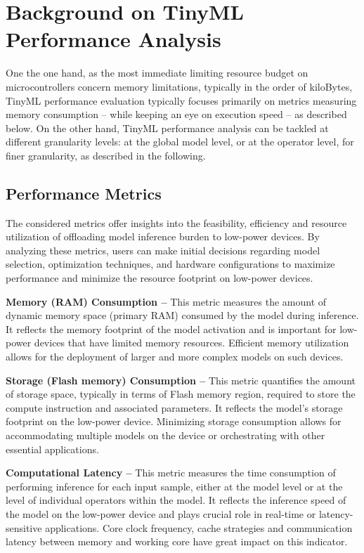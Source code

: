 
\section{Background on TinyML Performance Analysis}

One the one hand, as the most immediate limiting resource budget on microcontrollers concern memory limitations, typically in the order of kiloBytes, TinyML performance evaluation typically focuses primarily on metrics measuring memory consumption -- while keeping an eye on execution speed -- as described below.
On the other hand, TinyML performance analysis can be tackled at different granularity levels: at the global model level, or at the operator level, for finer granularity, as described in the following.

\subsection{Performance Metrics}
The considered metrics offer insights into the feasibility, efficiency and resource utilization of offloading model inference burden to low-power devices. By analyzing these metrics, users can make initial decisions regarding model  selection, optimization techniques, and hardware configurations to maximize performance and minimize the resource footprint on low-power devices.

{\bf Memory (RAM) Consumption --}
This metric measures the amount of dynamic memory space (primary RAM) consumed by the model during inference. It reflects the memory footprint of the model activation and is important for low-power devices that have limited memory resources. Efficient memory utilization allows for the deployment of larger and more complex models on such devices.

{\bf Storage (Flash memory) Consumption --}
This metric quantifies the amount of storage space, typically in terms of Flash memory region, required to store the compute instruction and associated parameters. It reflects the model's storage footprint on the low-power device. Minimizing storage consumption allows for accommodating multiple models on the device or orchestrating with other essential applications.

{\bf Computational Latency --} This metric measures the time consumption  of performing inference for each input sample, either at the model level or at the level of individual operators within the model. It reflects the inference speed of the model on the low-power device and plays crucial role in real-time or latency-sensitive applications. Core clock frequency, cache strategies and communication latency between memory and working core have great impact on this indicator.


